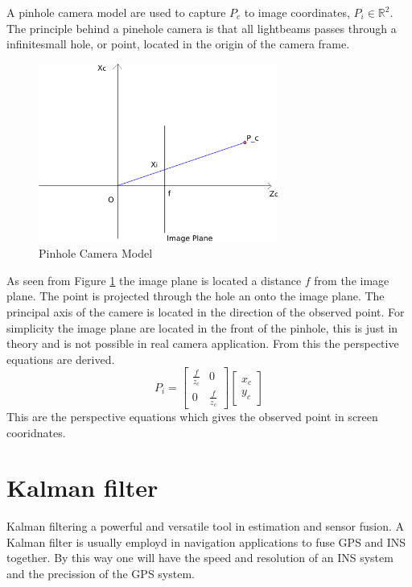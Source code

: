 	A pinhole camera model are used to capture $P_c$ to image coordinates, $P_i \in
	\mathbb{R}^2$. 
	The principle behind a pinehole camera is that all lightbeams passes through a
	infinitesmall hole, or point, located in the origin of the camera frame.   
	\begin{figure}[hbtp]
		\centering
		\includegraphics[width=0.7\textwidth]{pics/pinhole_model2}
		\caption{Pinhole Camera Model}
		\label{fig:ch1-pinhole}
	\end{figure}
			
	As seen from Figure \ref{fig:ch1-pinhole} the image plane is located a distance $f$ from the image plane. 
	The point is projected through the hole an onto the image plane. The principal axis of the camere is located in the
	direction of the observed point. For simplicity the image plane are located in the front of the
	pinhole, this is just in theory and is not possible in real camera application. From this the
	perspective equations are derived. \cite{robotbok}
	\begin{equation}
		\label{eq:ch1-perspective}
		P_i = \left[ \begin{array}{cc}
					\frac{f}{z_c} & 0 \\
					0	& \frac{f}{z_c} 
				\end{array} \right] 
				\left[ \begin{array}{c}
					x_c \\
					y_c
					\end{array} \right]
	\end{equation}
	This are the perspective equations which gives the observed point in screen cooridnates. 

\section{Kalman filter}
	Kalman filtering a powerful and versatile tool in estimation and sensor fusion. A Kalman filter is
	usually employd in navigation applications to fuse GPS and INS together. By this way one will have
	the speed and resolution of an INS system and the precission of the GPS system.
	

